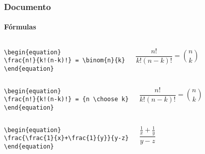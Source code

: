 \begin{frame}[fragile]
\frametitle{Documento}
\framesubtitle{Fórmulas}
  \scriptsize
  \begin{columns}[c]
  \begin{verbatim}
\begin{equation}
\frac{n!}{k!(n-k)!} = \binom{n}{k}
\end{equation}
  \end{verbatim}
  \begin{fmpage}{\textwidth}
\begin{equation}
\frac{n!}{k!(n-k)!} = \binom{n}{k}
\end{equation}
  \end{fmpage}
  \end{columns}


  \begin{columns}[c]
  \begin{verbatim}
\begin{equation}
\frac{n!}{k!(n-k)!} = {n \choose k}
\end{equation}
  \end{verbatim}
  \begin{fmpage}{\textwidth}
\begin{equation}
\frac{n!}{k!(n-k)!} = {n \choose k}
\end{equation}
  \end{fmpage}
  \end{columns}

  \begin{columns}[c]
  \begin{verbatim}
\begin{equation}
\frac{\frac{1}{x}+\frac{1}{y}}{y-z}
\end{equation}
  \end{verbatim}
  \begin{fmpage}{\textwidth}
\begin{equation}
\frac{\frac{1}{x}+\frac{1}{y}}{y-z}
\end{equation}
  \end{fmpage}
  \end{columns}
\end{frame}



